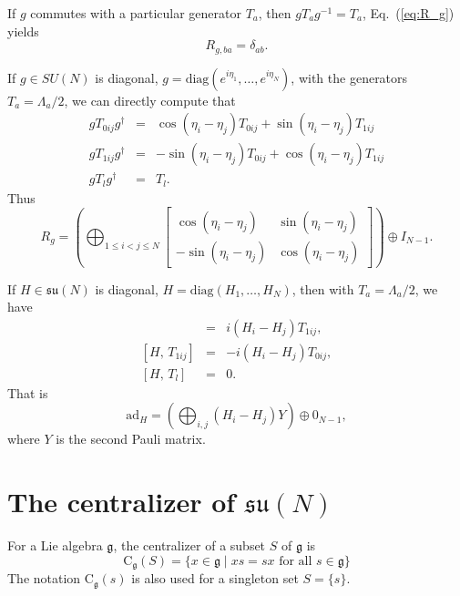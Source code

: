 \documentclass{article}
\begin{document}
If $g$ commutes with a particular generator $T_a$, then $gT_ag^{-1} = T_a$,
Eq.~(\ref{eq:R_g}) yields
\begin{equation}
  \label{eq:R_g_1}
  R_{g,ba} = \delta_{ab}.
\end{equation}

If $g\in SU(N)$ is diagonal, $g = \text{diag}(e^{i\eta_1},\ldots,e^{i\eta_N})$,
with the generators $T_a = \Lambda_a/2$, we can directly compute that
\begin{eqnarray}
  gT_{0ij}g^\dagger & = & \cos(\eta_i-\eta_j)T_{0ij} + \sin(\eta_i-\eta_j)T_{1ij} \\
  gT_{1ij}g^\dagger & = & -\sin(\eta_i-\eta_j)T_{0ij} + \cos(\eta_i-\eta_j)T_{1ij} \\
  gT_lg^\dagger & = & T_l.
\end{eqnarray}
Thus
\begin{equation}
  \label{eq:R_g_diag}
  R_g = \left(\bigoplus_{1\le i < j \le N}
  \begin{bmatrix}
    \cos(\eta_i-\eta_j) & \sin(\eta_i-\eta_j) \\
    -\sin(\eta_i-\eta_j) & \cos(\eta_i-\eta_j)
  \end{bmatrix}\right)
  \oplus I_{N-1}.
\end{equation}

If $H\in \mathfrak{su}(N)$ is diagonal, $H = \text{diag}(H_1,\ldots,H_N)$,
then with $T_a = \Lambda_a/2$, we have
\begin{eqnarray}
  [H,\, T_{0ij}] & = & i(H_i-H_j)T_{1ij}, \\{}
  [H,\, T_{1ij}] & = & -i(H_i-H_j)T_{0ij}, \\{}
  [H,\, T_l] & = & 0.
\end{eqnarray}
That is
\begin{equation}
  \label{eq:ad_h}
  \text{ad}_H = \left(\bigoplus_{i,j}(H_i-H_j)Y\right)\oplus0_{N-1},
\end{equation}
where $Y$ is the second Pauli matrix.


\section{The centralizer of \texorpdfstring{$\mathfrak{su}(N)$}{su(N)}}
\label{appendix:centralizer}
For a Lie algebra $\mathfrak{g}$, the centralizer\cite{jacobson_1979}
of a subset $S$ of $\mathfrak{g}$ is
\begin{equation}
  \text{C}_{\mathfrak{g}}(S) = \{x\in \mathfrak{g}\mid xs = sx \text{ for all } s\in \mathfrak{g}\}
\end{equation}
The notation $\text{C}_{\mathfrak{g}}(s)$ is also used for a singleton set
$S = \{s\}$.
\end{document}

